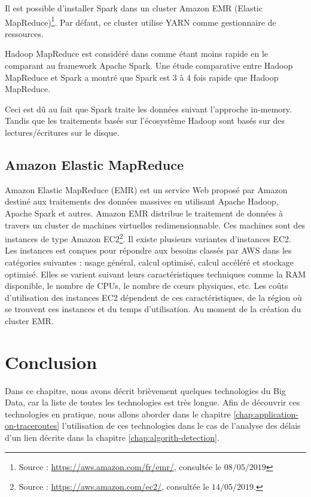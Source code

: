 Il est possible d'installer Spark dans un cluster Amazon EMR (Elastic MapReduce)\footnote{Source : \url{https://aws.amazon.com/fr/emr/}, consultée le $08/05/2019$}. Par défaut, ce cluster utilise YARN comme gestionnaire de ressources.

Hadoop MapReduce est considéré dans \cite{Global-Journals} comme étant moins rapide en le comparant au framework Apache Spark.  Une étude \cite{article-comparaison-spark-hadoop} comparative entre Hadoop MapReduce et Spark a montré que Spark est $ 3 $ à $ 4 $ fois rapide que Hadoop MapReduce.

 Ceci est dû au fait que Spark traite les données suivant l'approche in-memory. Tandis que  les traitements basés sur l'écosystème Hadoop sont basés sur des lectures/écritures sur le disque.  
\subsection{Amazon Elastic MapReduce}

Amazon Elastic MapReduce (EMR) est  un service Web proposé par Amazon  destiné aux traitements des données massives en utilisant Apache Hadoop, Apache Spark et autres.
Amazon EMR distribue le traitement de données à travers un cluster  de machines virtuelles redimensionnable. Ces machines sont des instances de type Amazon EC2\footnote{Source : \url{https://aws.amazon.com/ec2/}, consultée le $14/05/2019$.}.
Il existe plusieurs variantes d'instances EC2. Les instances est conçues pour répondre 
aux besoins classés par AWS dans les catégories suivantes : usage général, calcul optimisé, calcul accéléré et stockage optimisé.
Elles se varient suivant leurs caractéristiques techniques comme la  RAM disponible, le nombre de CPUs, le nombre de c\oe{}urs physiques, etc. Les coûts d'utilisation des instances EC2 dépendent de ces caractéristiques,  de la région où se trouvent ces instances et du temps d'utilisation. Au moment de la création du cluster EMR. 


\section{Conclusion}

Dans ce chapitre,  nous avons décrit brièvement  quelques technologies du Big Data, car la liste de toutes les technologies est très longue. Afin de découvrir ces technologies en pratique, nous allons aborder dans le chapitre \ref{chap:application-on-traceroutes} l'utilisation de ces technologies dans le cas de l'analyse des délais d'un lien décrite dans la chapitre \ref{chap:algorith-detection}.    









